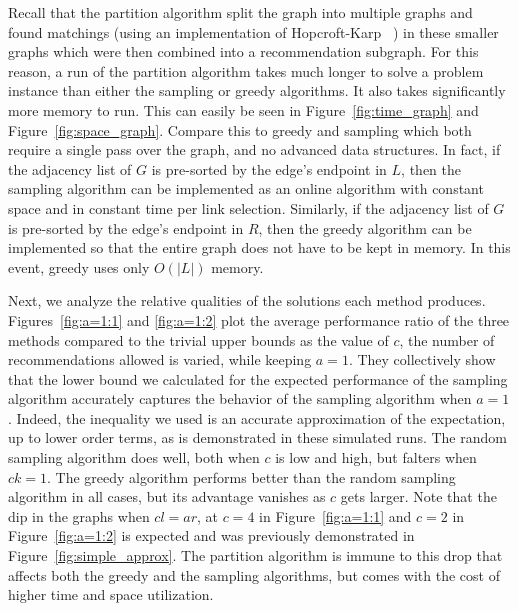 Recall that the partition algorithm split the graph into multiple graphs
and found matchings (using an implementation of Hopcroft-Karp ~\cite{HopcroftKarp}) 
in these smaller graphs which were then combined into
a recommendation subgraph. For this reason, a run of the partition
algorithm takes much longer to solve a problem instance than either the
sampling or greedy algorithms. It also takes significantly more memory to
run. This can easily be seen in Figure~\ref{fig:time_graph} and Figure~\ref{fig:space_graph}.
Compare this to greedy and sampling which both require a single pass over
the graph, and no advanced data structures. In fact, if the adjacency list
of $G$ is pre-sorted by the edge's endpoint in $L$, then the sampling algorithm can be
implemented as an online algorithm with constant space and in constant time 
per link selection. Similarly, if the adjacency list of $G$
is pre-sorted by the edge's endpoint in $R$, then the greedy algorithm can
be implemented so that the entire graph does not have to be kept in memory. In this
event, greedy uses only $O(|L|)$ memory.\vs

Next, we analyze the relative qualities of the solutions each method
produces.  Figures~\ref{fig:a=1:1} and \ref{fig:a=1:2} plot the
average performance ratio of the three methods compared to the trivial
upper bounds as the value of $c$, the number of recommendations
allowed is varied, while keeping $a = 1$.
They collectively show that the lower bound we calculated for the
expected performance of the sampling algorithm accurately captures the
behavior of the sampling algorithm when $a=1$. Indeed, the inequality
we used is an accurate approximation of the expectation, up to lower
order terms, as is demonstrated in these simulated runs.  The random
sampling algorithm does well, both when $c$ is low and high, but
falters when $ck=1$. The greedy algorithm performs better than the
random sampling algorithm in all cases, but its advantage vanishes as
$c$ gets larger. Note that the dip in the graphs when $cl=ar$, at
$c=4$ in Figure~\ref{fig:a=1:1} and $c=2$ in Figure~\ref{fig:a=1:2} is
expected and was previously demonstrated in
Figure~\ref{fig:simple_approx}.  The partition algorithm is immune to
this drop that affects both the greedy and the sampling algorithms,
but comes with the cost of higher time and space utilization.

